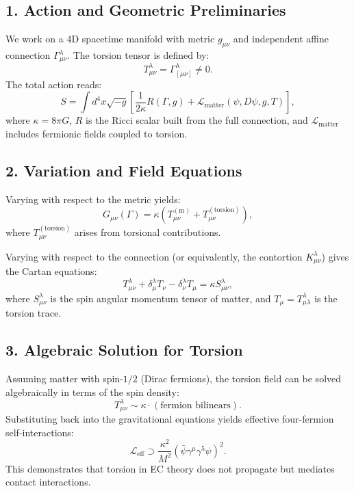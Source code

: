 \documentclass{article}
\begin{document}
\subsection*{1. Action and Geometric Preliminaries}
We work on a 4D spacetime manifold with metric $g_{\mu\nu}$ and independent affine connection $\Gamma^{\lambda}_{\mu\nu}$. The torsion tensor is defined by:
\begin{equation}\label{eq:auto244}
T^{\lambda}_{\mu\nu} = \Gamma^{\lambda}_{[\mu\nu]} \neq 0.
\end{equation}
The total action reads:
\begin{equation}\label{eq:auto245}
S = \int d^4x \sqrt{-g} \left[ \frac{1}{2\kappa} R(\Gamma, g) + \mathcal{L}_\text{matter}(\psi, D\psi, g, T) \right],
\end{equation}
where $\kappa = 8\pi G$, $R$ is the Ricci scalar built from the full connection, and $\mathcal{L}_\text{matter}$ includes fermionic fields coupled to torsion.

\subsection*{2. Variation and Field Equations}
Varying with respect to the metric yields:
\begin{equation}\label{eq:auto246}
G_{\mu\nu}(\Gamma) = \kappa \left(T_{\mu\nu}^{(\text{m})} + T_{\mu\nu}^{(\text{torsion})}\right),
\end{equation}
where $T_{\mu\nu}^{(\text{torsion})}$ arises from torsional contributions.

Varying with respect to the connection (or equivalently, the contortion $K^{\lambda}_{\mu\nu}$) gives the Cartan equations:
\begin{equation}\label{eq:auto247}
T^{\lambda}_{\mu\nu} + \delta^{\lambda}_{\mu} T_{\nu} - \delta^{\lambda}_{\nu} T_{\mu} = \kappa S^{\lambda}_{\mu\nu},
\end{equation}
where $S^{\lambda}_{\mu\nu}$ is the spin angular momentum tensor of matter, and $T_\mu = T^{\lambda}_{\mu\lambda}$ is the torsion trace.

\subsection*{3. Algebraic Solution for Torsion}
Assuming matter with spin-$1/2$ (Dirac fermions), the torsion field can be solved algebraically in terms of the spin density:
\begin{equation}\label{eq:auto248}
T^{\lambda}_{\mu\nu} \sim \kappa \cdot (\text{fermion bilinears}).
\end{equation}
Substituting back into the gravitational equations yields effective four-fermion self-interactions:
\begin{equation}\label{eq:auto249}
\mathcal{L}_\text{eff} \supset \frac{\kappa^2}{M^2} (\bar{\psi} \gamma^\mu \gamma^5 \psi)^2.
\end{equation}
This demonstrates that torsion in EC theory does not propagate but mediates contact interactions.
\end{document}
